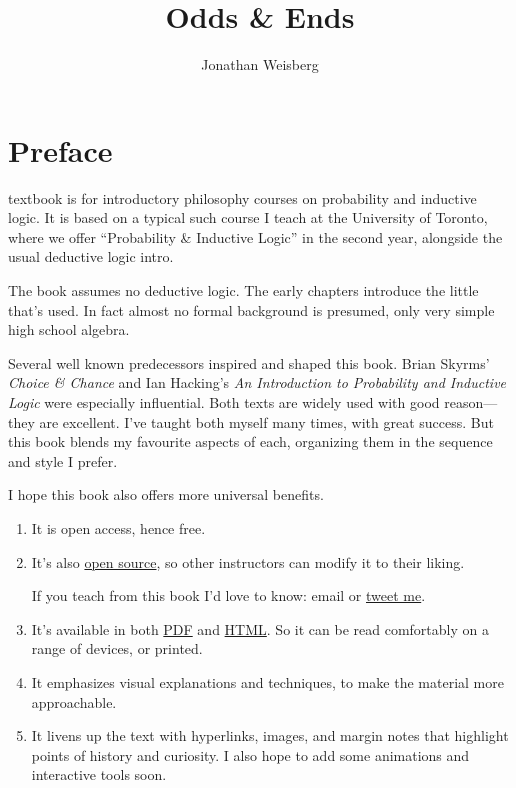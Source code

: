 \documentclass[justified]{tufte-book}
\title{Odds \& Ends}
\author{Jonathan Weisberg}
\date{}
\providecommand{\tightlist}{%
  \setlength{\itemsep}{0pt}\setlength{\parskip}{0pt}}
\theoremstyle{definition}
\theoremstyle{definition}
\theoremstyle{definition}
\theoremstyle{remark}
\begin{document}
\maketitle



{
\setcounter{tocdepth}{1}
\tableofcontents
}

\hypertarget{preface}{%
\chapter*{Preface}\label{preface}}

 textbook is for introductory philosophy courses on probability and inductive logic. It is based on a typical such course I teach at the University of Toronto, where we offer ``Probability \& Inductive Logic'' in the second year, alongside the usual deductive logic intro.\(\,\)

The book assumes no deductive logic. The early chapters introduce the little that's used. In fact almost no formal background is presumed, only very simple high school algebra.

Several well known predecessors inspired and shaped this book. Brian Skyrms' \emph{Choice \& Chance} and Ian Hacking's \emph{An Introduction to Probability and Inductive Logic} were especially influential. Both texts are widely used with good reason---they are excellent. I've taught both myself many times, with great success. But this book blends my favourite aspects of each, organizing them in the sequence and style I prefer.

I hope this book also offers more universal benefits.

\begin{enumerate}
\def\labelenumi{\arabic{enumi}.}
\tightlist
\item
  It is open access, hence free.
\item
  It's also \href{https://github.com/jweisber/vip-source}{open source}, so other instructors can modify it to their liking.

  \begin{marginfigure}
   If you teach from this book I'd love to know: email or
   \href{https://twitter.com/jweisber}{tweet me}.
   \end{marginfigure}
\item
  It's available in both \href{http://jonathanweisberg.org/vip/_main.pdf}{PDF} and \href{http://jonathanweisberg.org/vip/}{HTML}. So it can be read comfortably on a range of devices, or printed.
\item
  It emphasizes visual explanations and techniques, to make the material more approachable.
\item
  It livens up the text with hyperlinks, images, and margin notes that highlight points of history and curiosity. I also hope to add some animations and interactive tools soon.
\end{enumerate}
\end{document}
